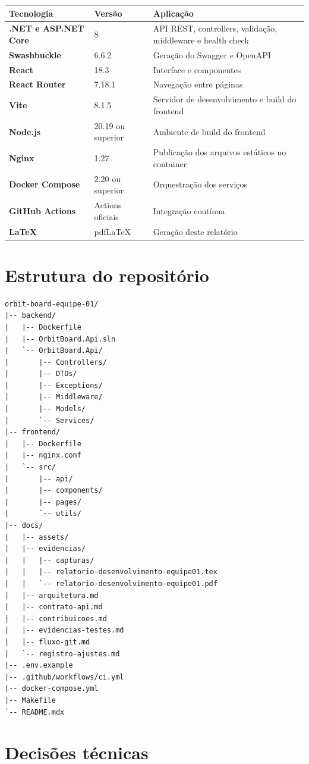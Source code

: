 \documentclass[12pt,a4paper,openany]{report}
\begin{document}
\begin{tabularx}{\textwidth}{>{\bfseries}p{} p{} X}
\toprule
Tecnologia & Versão & Aplicação \\
\midrule
.NET e ASP.NET Core & 8 & API REST, controllers, validação, middleware e health check \\
Swashbuckle & 6.6.2 & Geração do Swagger e OpenAPI \\
React & 18.3 & Interface e componentes \\
React Router & 7.18.1 & Navegação entre páginas \\
Vite & 8.1.5 & Servidor de desenvolvimento e build do frontend \\
Node.js & 20.19 ou superior & Ambiente de build do frontend \\
Nginx & 1.27 & Publicação dos arquivos estáticos no container \\
Docker Compose & 2.20 ou superior & Orquestração dos serviços \\
GitHub Actions & Actions oficiais & Integração contínua \\
LaTeX & pdfLaTeX & Geração deste relatório \\
\bottomrule
\end{tabularx}

\section{Estrutura do repositório}

\begin{lstlisting}
orbit-board-equipe-01/
|-- backend/
|   |-- Dockerfile
|   |-- OrbitBoard.Api.sln
|   `-- OrbitBoard.Api/
|       |-- Controllers/
|       |-- DTOs/
|       |-- Exceptions/
|       |-- Middleware/
|       |-- Models/
|       `-- Services/
|-- frontend/
|   |-- Dockerfile
|   |-- nginx.conf
|   `-- src/
|       |-- api/
|       |-- components/
|       |-- pages/
|       `-- utils/
|-- docs/
|   |-- assets/
|   |-- evidencias/
|   |   |-- capturas/
|   |   |-- relatorio-desenvolvimento-equipe01.tex
|   |   `-- relatorio-desenvolvimento-equipe01.pdf
|   |-- arquitetura.md
|   |-- contrato-api.md
|   |-- contribuicoes.md
|   |-- evidencias-testes.md
|   |-- fluxo-git.md
|   `-- registro-ajustes.md
|-- .env.example
|-- .github/workflows/ci.yml
|-- docker-compose.yml
|-- Makefile
`-- README.mdx
\end{lstlisting}

\section{Decisões técnicas}
\end{document}
